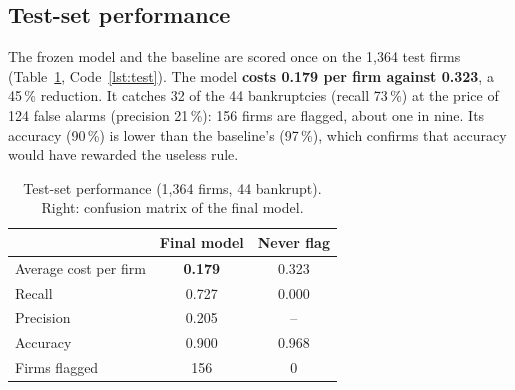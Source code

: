 \documentclass[11pt,a4paper]{article}
\newcommand{\tablefont}{\sffamily\small}
\begin{document}
\subsection{Test-set performance}
The frozen model and the baseline are scored once on the 1,364 test firms (Table~\ref{tab:test}, Code~\ref{lst:test}). The model \textbf{costs 0.179 per firm against 0.323}, a 45\,\% reduction. It catches 32 of the 44 bankruptcies (recall 73\,\%) at the price of 124 false alarms (precision 21\,\%): 156 firms are flagged, about one in nine. Its accuracy (90\,\%) is lower than the baseline's (97\,\%), which confirms that accuracy would have rewarded the useless rule.

\begin{table}[htbp]\centering\tablefont
  \caption{Test-set performance (1,364 firms, 44 bankrupt). Right: confusion matrix of the final model.}\label{tab:test}
  \begin{minipage}[c]{0.52\linewidth}\centering
    \begin{tabular}{lcc}
      \toprule
      & Final model & Never flag \\
      \midrule
      Average cost per firm & \textbf{0.179} & 0.323 \\
      Recall & 0.727 & 0.000 \\
      Precision & 0.205 & -- \\
      Accuracy & 0.900 & 0.968 \\
      Firms flagged & 156 & 0 \\
      \bottomrule
    \end{tabular}
  \end{minipage}\hfill
  \begin{minipage}[c]{0.44\linewidth}\centering
  \end{minipage}
\end{table}
\end{document}
